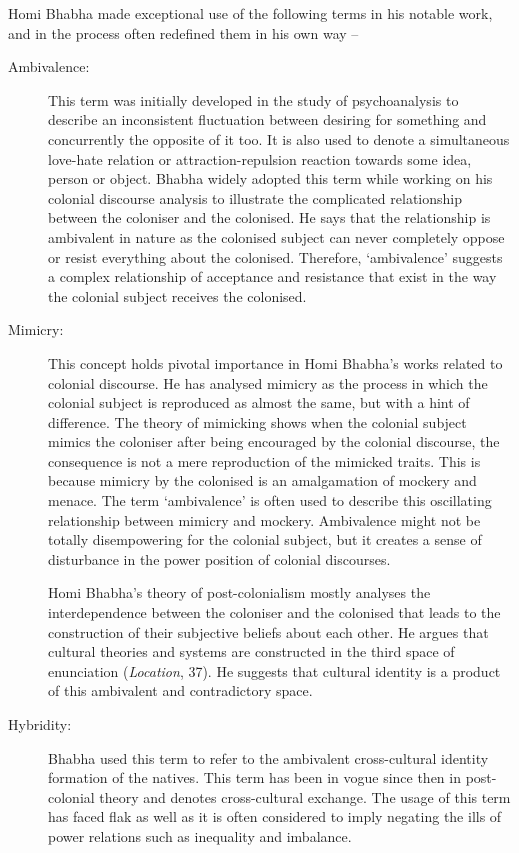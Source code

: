Homi Bhabha made exceptional use of the following terms in his notable work, and in the process often redefined them in his own way --

\begin{description}
 \item[Ambivalence:]
 This term was initially developed in the study of psychoanalysis to describe an inconsistent fluctuation between desiring for something and concurrently the opposite of it too. It is also used to denote a simultaneous love-hate relation or attraction-repulsion reaction towards some idea, person or object. Bhabha widely adopted this term while working on his colonial discourse analysis to illustrate the complicated relationship between the coloniser and the colonised. He says that the relationship is ambivalent in nature as the colonised subject can never completely oppose or resist everything about the colonised. Therefore, ‘ambivalence’ suggests a complex relationship of acceptance and resistance that exist in the way the colonial subject receives the colonised.

 \item[Mimicry:]
 This concept holds pivotal importance in Homi Bhabha’s works related to colonial discourse. He has analysed mimicry as the process in which the colonial subject is reproduced as almost the same, but with a hint of difference. The theory of mimicking shows when the colonial subject mimics the coloniser after being encouraged by the colonial discourse, the consequence is not a mere reproduction of the mimicked traits. This is because mimicry by the colonised is an amalgamation of mockery and menace. The term ‘ambivalence’ is often used to describe this oscillating relationship between mimicry and mockery. Ambivalence might not be totally disempowering for the colonial subject, but it creates a sense of disturbance in the power position of colonial discourses.
 
 Homi Bhabha’s theory of post-colonialism mostly analyses the interdependence between the coloniser and the colonised that leads to the construction of their subjective beliefs about each other. He argues that cultural theories and systems are constructed in the third space of enunciation (\emph{Location}, 37). He suggests that cultural identity is a product of this ambivalent and contradictory space.
 
 \item[Hybridity:]
 Bhabha used this term to refer to the ambivalent cross-cultural identity formation of the natives. This term has been in vogue since then in post-colonial theory and denotes cross-cultural exchange. The usage of this term has faced flak as well as it is often considered to imply negating the ills of power relations such as inequality and imbalance. 
 

\end{description}
